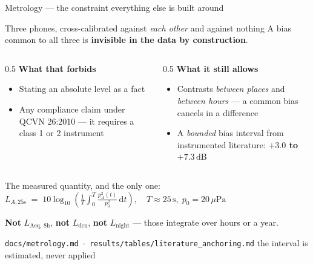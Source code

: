 \documentclass[aspectratio=169,10pt]{beamer}
\newcommand{\src}[1]{{\scriptsize\color{muted}\texttt{#1}}}
\newcommand{\aside}[1]{{\scriptsize\color{muted}#1}}
\newcommand{\wn}[1]{\textcolor{warn}{\textbf{#1}}}
\newcommand{\dB}{\,\mathrm{dB}}
\begin{document}
\begin{frame}{Metrology --- the constraint everything else is built around}
  \begin{alertblock}{Three phones, cross-calibrated against \emph{each other} and against nothing}
    A bias common to all three is \textbf{invisible in the data by construction}.
  \end{alertblock}
  \vspace{.2em}
  \begin{columns}[T]
    \begin{column}{0.5\textwidth}
      \textbf{What that forbids}
      \begin{itemize}
        \item Stating an absolute level as a fact
        \item Any compliance claim under QCVN 26:2010 --- it requires a class 1
              or 2 instrument
      \end{itemize}
    \end{column}
    \begin{column}{0.5\textwidth}
      \textbf{What it still allows}
      \begin{itemize}
        \item Contrasts \emph{between places} and \emph{between hours} --- a
              common bias cancels in a difference
        \item A \emph{bounded} bias interval from instrumented literature:
              \wn{$+3.0$ to $+7.3\dB$}
      \end{itemize}
    \end{column}
  \end{columns}
  \vfill
  \begin{center}
    The measured quantity, and the only one:\quad
    $\displaystyle L_{A,25\mathrm{s}} \;=\; 10\log_{10}\!\left(\frac{1}{T}
      \int_{0}^{T}\frac{p_A^{2}(t)}{p_0^{2}}\,\mathrm{d}t\right),
      \quad T \approx 25\,\mathrm{s},\; p_0 = 20\,\mu\mathrm{Pa}$
  \end{center}
  \vspace{-.1em}
  \begin{center}
    \textbf{Not} $L_\mathrm{Aeq,\,8h}$, \textbf{not} $L_\mathrm{den}$,
    \textbf{not} $L_\mathrm{night}$ --- those integrate over hours or a year.
  \end{center}
  \src{docs/metrology.md \; $\cdot$ \; results/tables/literature\_anchoring.md} \; \aside{the interval is estimated, never applied}
\end{frame}
\end{document}
